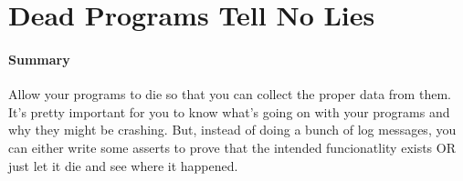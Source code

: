 \documentclass{article}
\begin{document}
\section{Dead Programs Tell No Lies}
    \paragraph{Summary} Allow your programs to die so that you can collect the proper data from them. It's pretty important for you to know what's going on with your programs and why they might be crashing. But, instead of doing a bunch of log messages, you can either write some asserts to prove that the intended funcionatlity exists OR just let it die and see where it happened.
\end{document}
